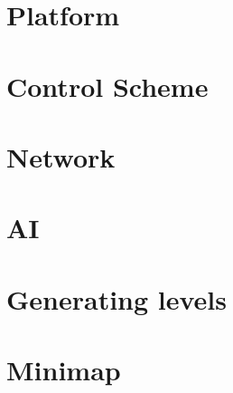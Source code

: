 \chapter{Platform}


\chapter{Control Scheme}


\chapter{Network}


\chapter{AI}


\chapter{Generating levels}


\chapter{Minimap}

